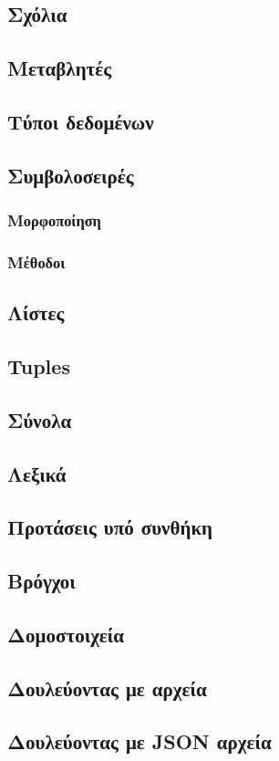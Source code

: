 \documentclass[a4paper,10pt]{report}
\begin{document}
\subsection{Σχόλια}
\subsection{Μεταβλητές}
\subsection{Τύποι δεδομένων}
\subsection{Συμβολοσειρές}
\subsubsection{Μορφοποίηση}
\subsubsection{Μέθοδοι}
\subsection{Λίστες}
\subsection{Tuples}
\subsection{Σύνολα}
\subsection{Λεξικά}
\subsection{Προτάσεις υπό συνθήκη}
\subsection{Βρόγχοι}
\subsection{Δομοστοιχεία}
\subsection{Δουλεύοντας με αρχεία}
\subsection{Δουλεύοντας με JSON αρχεία}
\end{document}
